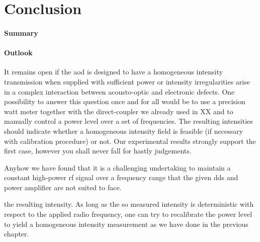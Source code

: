 \chapter{Conclusion}


\subsubsection{Summary}

\subsubsection{Outlook}

It remains open if the \gls{aod} is designed to have a homogeneous intensity
transmission when supplied with sufficient power or intensity irregularities
arise in a complex interaction between acousto-optic and electronic defects.
One possibility to answer this question once and for all would be to use a
precision watt meter together with the direct-coupler we already used in XX
and to manually control a power level over a set of frequencies. The
resulting intensities should indicate whether a homogeneous intensity field
is feasible (if necessary with calibration procedure) or not. Our
experimental results strongly support the first case, however you shall never
fall for hastly judgements.

Anyhow we have found that it is a challenging undertaking to maintain a
constant high-power \gls{rf} signal over a frequency range that the given
\gls{dds} and power amplifier are not suited to face.


the resulting intensity. As long as the so measured intensity is
deterministic with respect to the applied radio frequency, one can try to
recalibrate the power level to yield a homogeneous intensity measurement as
we have done in the previous chapter.
